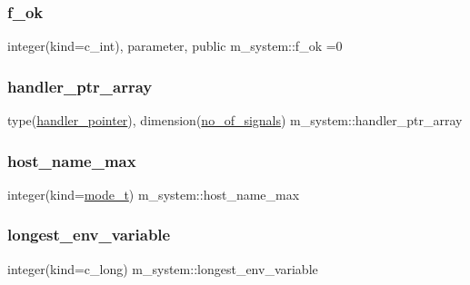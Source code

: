 \subsubsection{\texorpdfstring{f\+\_\+ok}{f\_ok}}
{\footnotesize\ttfamily integer(kind=c\+\_\+int), parameter, public m\+\_\+system\+::f\+\_\+ok =0}

\mbox{\label{namespacem__system_a2da68c4639de85352f306b0e39debf77}} 
\subsubsection{\texorpdfstring{handler\+\_\+ptr\+\_\+array}{handler\_ptr\_array}}
{\footnotesize\ttfamily type(\mbox{\hyperlink{structm__system_1_1handler__pointer}{handler\+\_\+pointer}}), dimension(\mbox{\hyperlink{namespacem__system_a4a9ba51ff75a0a6176f31e0562d0a058}{no\+\_\+of\+\_\+signals}}) m\+\_\+system\+::handler\+\_\+ptr\+\_\+array\hspace{0.3cm}{\ttfamily [private]}}

\mbox{\label{namespacem__system_a6501a3671053239dae9b69b95c0a5f55}} 
\subsubsection{\texorpdfstring{host\+\_\+name\+\_\+max}{host\_name\_max}}
{\footnotesize\ttfamily integer(kind=\mbox{\hyperlink{namespacem__system_abdb5cc27c945379d844db4830d499050}{mode\+\_\+t}}) m\+\_\+system\+::host\+\_\+name\+\_\+max\hspace{0.3cm}{\ttfamily [private]}}

\mbox{\label{namespacem__system_ac066b6866f8ef4b8c358ec8daca7566c}} 
\subsubsection{\texorpdfstring{longest\+\_\+env\+\_\+variable}{longest\_env\_variable}}
{\footnotesize\ttfamily integer(kind=c\+\_\+long) m\+\_\+system\+::longest\+\_\+env\+\_\+variable\hspace{0.3cm}{\ttfamily [private]}}

